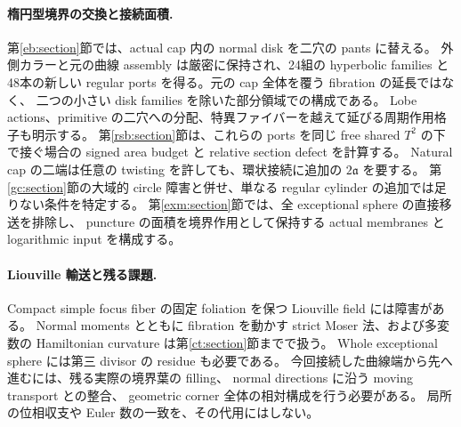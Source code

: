 \documentclass[11pt,a4paper]{article}
\theoremstyle{definition}
\begin{document}
\paragraph{楕円型境界の交換と接続面積.}
第\ref{eb:section}節では、actual cap 内の normal disk を二穴の pants に替える。
外側カラーと元の曲線 assembly は厳密に保持され、24組の hyperbolic families と
48本の新しい regular ports を得る。元の cap 全体を覆う fibration の延長ではなく、
二つの小さい disk families を除いた部分領域での構成である。
Lobe actions、primitive の二穴への分配、特異ファイバーを越えて延びる周期作用格子も明示する。
第\ref{rsb:section}節は、これらの ports を同じ free shared $T^2$ の下で接ぐ場合の
signed area budget と relative section defect を計算する。
Natural cap の二端は任意の twisting を許しても、環状接続に追加の $2\mathfrak a$ を要する。
第\ref{gc:section}節の大域的 circle 障害と併せ、単なる regular cylinder の追加では足りない条件を特定する。
第\ref{exm:section}節では、全 exceptional sphere の直接移送を排除し、
puncture の面積を境界作用として保持する actual membranes と logarithmic input を構成する。

\paragraph{Liouville 輸送と残る課題.}
Compact simple focus fiber の固定 foliation を保つ Liouville field には障害がある。
Normal moments とともに fibration を動かす strict Moser 法、および多変数の
Hamiltonian curvature は第\ref{ct:section}節までで扱う。
Whole exceptional sphere には第三 divisor の residue も必要である。
今回接続した曲線端から先へ進むには、残る実際の境界葉の filling、
normal directions に沿う moving transport との整合、
geometric corner 全体の相対構成を行う必要がある。
局所の位相収支や Euler 数の一致を、その代用にはしない。
\end{document}
